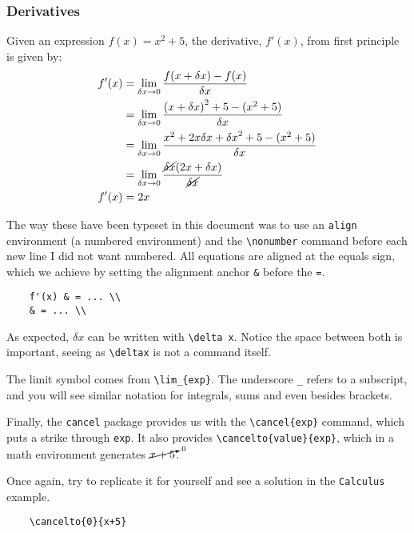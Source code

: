 \subsubsection{Derivatives}
Given an expression \( f(x) = x^2+5 \), the derivative, \( f'(x) \), from first principle is given by:
\begin{align}
    f'(x) &= \lim_{\delta x \to 0}
        \frac{
            f(x + \delta x) - f(x)
        }{ \delta x }
    \\
    &= \lim_{\delta x \to 0}
        \frac{
            {(x + \delta x)}^2+5 - (x^2+5)
        }{ \delta x }
    \nonumber \\
    &= \lim_{\delta x \to 0}
        \frac{
            x^2 + 2x\delta x + {\delta x}^2 +5 - (x^2+5)
        }{ \delta x }
    \nonumber \\
    &= \lim_{\delta x \to 0}
        \frac{
            \cancel{\delta x} (2x + \delta x)
        }{ \cancel{\delta x} }
    \nonumber \\
    f'(x) &= 2x 
\end{align}

The way these have been typeset in this document was to use an \verb|align| environment (a numbered environment) and the \verb|\nonumber| command before each new line I did not want numbered.
All equations are aligned at the equals sign, which we achieve by setting the alignment anchor \verb|&| before the \verb|=|.

\clearpage

\begin{lstlisting}
    f'(x) & = ... \\
    & = ... \\
\end{lstlisting} 

As expected, \( \delta x\) can be written with \verb|\delta x|. Notice the space between both is important, seeing as \verb|\deltax| is not a command itself.

The limit symbol comes from \verb|\lim_{exp}|. The underscore \verb|_| refers to a subscript, and you will see similar notation for integrals, sums and even besides brackets.

Finally, the \texttt{cancel} package provides us with the \verb|\cancel{exp}| command, which puts a strike through \verb|exp|.
It also provides \verb|\cancelto{value}{exp}|, which in a math environment generates \( \cancelto{0}{x+5} \).

Once again, try to replicate it for yourself and see a solution in the \texttt{Calculus} example.
\begin{lstlisting}
    \cancelto{0}{x+5}
\end{lstlisting} 

